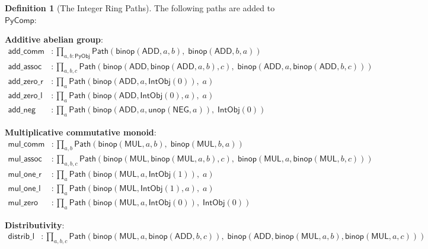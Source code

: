 \documentclass[11pt,a4paper]{report}
\theoremstyle{definition}
\newtheorem{definition}{Definition}[chapter]
\theoremstyle{plain}
\newcommand{\Path}{\mathsf{Path}}
\newcommand{\PyObj}{\mathsf{PyObj}}
\begin{document}
\begin{definition}[The Integer Ring Paths]
\label{def:int-ring}
The following paths are added to $\mathsf{PyComp}$:

\textbf{Additive abelian group}:
\begin{align}
  \mathsf{add\_comm} &: \prod_{a,b : \PyObj}
    \Path(\mathsf{binop}(\mathsf{ADD}, a, b),\;
          \mathsf{binop}(\mathsf{ADD}, b, a))
    \tag{R1} \\
  \mathsf{add\_assoc} &: \prod_{a,b,c}
    \Path(\mathsf{binop}(\mathsf{ADD}, \mathsf{binop}(\mathsf{ADD}, a, b), c),\;
          \mathsf{binop}(\mathsf{ADD}, a, \mathsf{binop}(\mathsf{ADD}, b, c)))
    \tag{R2} \\
  \mathsf{add\_zero\_r} &: \prod_a
    \Path(\mathsf{binop}(\mathsf{ADD}, a, \mathsf{IntObj}(0)),\; a)
    \tag{R3} \\
  \mathsf{add\_zero\_l} &: \prod_a
    \Path(\mathsf{binop}(\mathsf{ADD}, \mathsf{IntObj}(0), a),\; a)
    \tag{R4} \\
  \mathsf{add\_neg} &: \prod_a
    \Path(\mathsf{binop}(\mathsf{ADD}, a, \mathsf{unop}(\mathsf{NEG}, a)),\;
          \mathsf{IntObj}(0))
    \tag{R5}
\end{align}

\textbf{Multiplicative commutative monoid}:
\begin{align}
  \mathsf{mul\_comm} &: \prod_{a,b}
    \Path(\mathsf{binop}(\mathsf{MUL}, a, b),\;
          \mathsf{binop}(\mathsf{MUL}, b, a))
    \tag{R6} \\
  \mathsf{mul\_assoc} &: \prod_{a,b,c}
    \Path(\mathsf{binop}(\mathsf{MUL}, \mathsf{binop}(\mathsf{MUL}, a, b), c),\;
          \mathsf{binop}(\mathsf{MUL}, a, \mathsf{binop}(\mathsf{MUL}, b, c)))
    \tag{R7} \\
  \mathsf{mul\_one\_r} &: \prod_a
    \Path(\mathsf{binop}(\mathsf{MUL}, a, \mathsf{IntObj}(1)),\; a)
    \tag{R8} \\
  \mathsf{mul\_one\_l} &: \prod_a
    \Path(\mathsf{binop}(\mathsf{MUL}, \mathsf{IntObj}(1), a),\; a)
    \tag{R9} \\
  \mathsf{mul\_zero} &: \prod_a
    \Path(\mathsf{binop}(\mathsf{MUL}, a, \mathsf{IntObj}(0)),\;
          \mathsf{IntObj}(0))
    \tag{R10}
\end{align}

\textbf{Distributivity}:
\begin{align}
  \mathsf{distrib\_l} &: \prod_{a,b,c}
    \Path(\mathsf{binop}(\mathsf{MUL}, a,
      \mathsf{binop}(\mathsf{ADD}, b, c)),\;
      \mathsf{binop}(\mathsf{ADD},
        \mathsf{binop}(\mathsf{MUL}, a, b),
        \mathsf{binop}(\mathsf{MUL}, a, c)))
    \tag{R11}
\end{align}


\end{definition}
\end{document}
